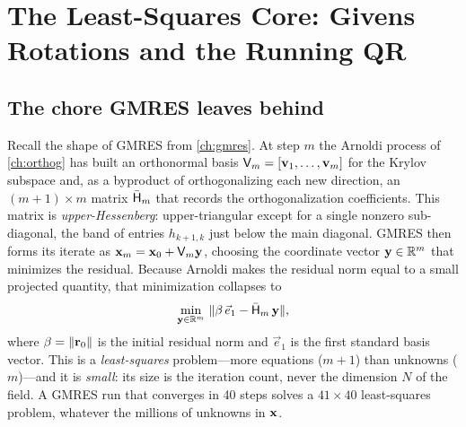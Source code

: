 \chapter{The Least-Squares Core: Givens Rotations and the Running QR}
\label{ch:givens}

\providecommand{\vg}{\mathbf{g}}
\providecommand{\vh}{\mathbf{h}}


\section{The chore GMRES leaves behind}
\label{sec:gv-setup}

Recall the shape of GMRES from \cref{ch:gmres}. At step $m$ the Arnoldi process of
\cref{ch:orthog} has built an orthonormal basis $\mathsf{V}_m = [\mathbf{v}_1,\dots,\mathbf{v}_m]$ for
the Krylov subspace and, as a byproduct of orthogonalizing each new direction, an
$(m{+}1)\times m$ matrix $\bar{\mathsf{H}}_m$ that records the orthogonalization
coefficients. This matrix is \emph{upper-Hessenberg}: upper-triangular except for a
single nonzero sub-diagonal, the band of entries $h_{k+1,k}$ just below the main
diagonal. GMRES then forms its iterate as $\mathbf{x}_m = \mathbf{x}_0 + \mathsf{V}_m\mathbf{y}$, choosing the
coordinate vector $\mathbf{y}\in\mathbb{R}^m$ that minimizes the residual. Because Arnoldi makes
the residual norm equal to a small projected quantity, that minimization collapses to
\begin{equation}
\label{eq:gv-lsq}
  \min_{\mathbf{y}\in\mathbb{R}^m}\ \lVert\beta\,\vec e_1 - \bar{\mathsf{H}}_m\,\mathbf{y}\rVert,
\end{equation}
where $\beta = \lVert\mathbf{r}_0\rVert$ is the initial residual norm and $\vec e_1$ is the first
standard basis vector. This is a \emph{least-squares} problem---more equations
($m{+}1$) than unknowns ($m$)---and it is \emph{small}: its size is the iteration
count, never the dimension $N$ of the field. A GMRES run that converges in 40 steps
solves a $41\times 40$ least-squares problem, whatever the millions of unknowns in
$\mathbf{x}$.

